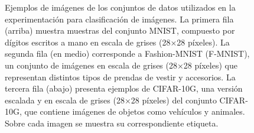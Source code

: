 \begin{figure}[!tbp]
    \centering
    \vspace{1.6cm}
    \vspace{1.6cm}
    \caption[Ejemplos de imágenes de los conjuntos de datos utilizados en la experimentación para clasificación de imágenes]{Ejemplos de imágenes de los conjuntos de datos utilizados en la experimentación para clasificación de imágenes. La primera fila (arriba) muestra muestras del conjunto MNIST, compuesto por dígitos escritos a mano en escala de grises (28×28 píxeles). La segunda fila (en medio) corresponde a Fashion-MNIST (F-MNIST), un conjunto de imágenes en escala de grises (28×28 píxeles) que representan distintos tipos de prendas de vestir y accesorios. La tercera fila (abajo) presenta ejemplos de CIFAR-10G, una versión escalada y en escala de grises (28×28 píxeles) del conjunto CIFAR-10G, que contiene imágenes de objetos como vehículos y animales. Sobre cada imagen se muestra su correspondiente etiqueta.}
\end{figure}

